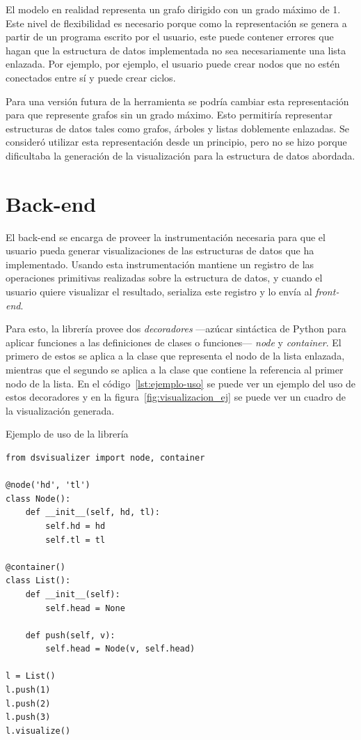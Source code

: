 El modelo en realidad representa un grafo dirigido con un grado máximo de 1. Este nivel de flexibilidad es necesario porque como la representación se genera a partir de un programa escrito por el usuario, este puede contener errores que hagan que la estructura de datos implementada no sea necesariamente una lista enlazada. Por ejemplo, por ejemplo, el usuario puede crear nodos que no estén conectados entre sí y puede crear ciclos.

Para una versión futura de la herramienta se podría cambiar esta representación para que represente grafos sin un grado máximo. Esto permitiría representar estructuras de datos tales como grafos, árboles y listas doblemente enlazadas. Se consideró utilizar esta representación desde un principio, pero no se hizo porque dificultaba la generación de la visualización para la estructura de datos abordada.

\section{Back-end}

El back-end se encarga de proveer la instrumentación necesaria para que el usuario pueda generar visualizaciones de las estructuras de datos que ha implementado. Usando esta instrumentación mantiene un registro de las operaciones primitivas realizadas sobre la estructura de datos, y cuando el usuario quiere visualizar el resultado, serializa este registro y lo envía al \textit{front-end}.

Para esto, la librería provee dos \textit{decoradores} ---azúcar sintáctica de Python para aplicar funciones a las definiciones de clases o funciones--- \textit{node} y \textit{container}. El primero de estos se aplica a la clase que representa el nodo de la lista enlazada, mientras que el segundo se aplica a la clase que contiene la referencia al primer nodo de la lista. En el código~\ref{lst:ejemplo-uso} se puede ver un ejemplo del uso de estos decoradores y en la figura~\ref{fig:visualizacion_ej} se puede ver un cuadro de la visualización generada.

\begin{listing}[h!]
\caption{Ejemplo de uso de la librería}
\label{lst:ejemplo-uso}
\begin{verbatim}
from dsvisualizer import node, container

@node('hd', 'tl')
class Node():
    def __init__(self, hd, tl):
        self.hd = hd
        self.tl = tl

@container()
class List():
    def __init__(self):
        self.head = None

    def push(self, v):
        self.head = Node(v, self.head)

l = List()
l.push(1)
l.push(2)
l.push(3)
l.visualize()
\end{verbatim}
\end{listing}


